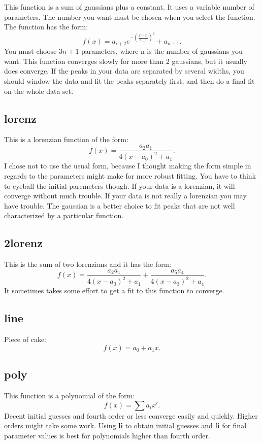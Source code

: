         This function is a sum of gaussians plus a constant.
 It uses a variable number of parameters.  The number you
 want must be chosen when you select the function.  The
 function has the form:
\[
 f(x) = a_{i+2}e^{-(\frac{x-a_{i}}{a_{i+1}})^2} + a_{n-1}.
\]
 You must choose $3n+1$ parameters, where n is the number of
 gaussians you want. This function converges slowly for more
 than 2 gaussians, but it usually does converge.  If the
 peaks in your data are separated by several widths, you
 should window the data and fit the peaks separately first,
 and then do a final fit on the whole data set.

\subsection{lorenz}

        This is a lorenzian function of the form:
\[
 f(x) = \frac{a_2 a_1}{4(x-a_0)^2 + a_1}.
\]
 I chose not to use the
 usual form, because I thought making the form simple in
 regards to the parameters might make for more robust
 fitting.  You have to think to eyeball the initial
 paremeters though.  If your data is a lorenzian, it will 
 converge without much trouble.  If your data is not really
 a lorenzian you may have trouble.  The gaussian is a
 better choice to fit peaks that are not well characterized
 by a particular function.

\subsection{2lorenz}

        This is the sum of two lorenzians and it has the
 form: 
\[
 f(x) = \frac{a_2 a_1}{4(x-a_0)^2 + a_1} + \frac{a_5 a_4}{4(x-a_3)^2 + a_4}.
\]
 It sometimes takes some effort to get a fit to this
 function to converge.

\subsection{line}

Piece of cake:
\[
f(x) = a_0 + a_1x.
\]

\subsection{poly}

 This function is a polynomial of the form:
\[
f(x) = \sum a_ix^i.
\]
 Decent initial guesses and
 fourth order or less converge easily and quickly.  Higher
 orders might take some work.  Using {\bf li} to obtain initial
 guesses and {\bf fi }for final parameter values is best for
 polynomials higher than fourth order.

